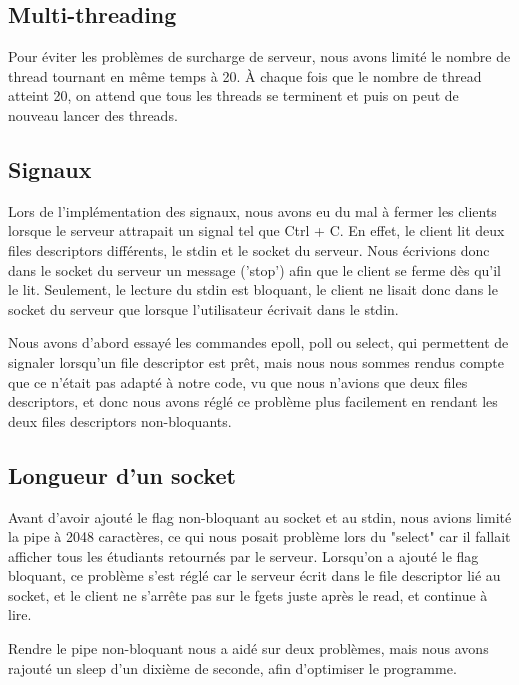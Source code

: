 \documentclass[utf8]{article}
\begin{document}
\begin{large}
\par
\subsection{Multi-threading}

\par 
\indent

Pour éviter les problèmes de surcharge de serveur, nous avons limité le nombre
de thread tournant en même temps à 20.
À chaque fois que le nombre de thread atteint 20, on attend que tous les threads se terminent 
et puis on peut de nouveau lancer des threads.
\par
\subsection{Signaux}
\par
\indent

Lors de l'implémentation des signaux, nous avons eu du mal à fermer les clients
lorsque le serveur attrapait un signal tel que Ctrl + C. En effet, le client lit
deux files descriptors différents, le stdin et le socket du serveur. Nous
écrivions donc dans le socket du serveur un message ('stop') afin que le client
se ferme dès qu'il le lit. Seulement, le lecture du stdin est bloquant, le
client ne lisait donc dans le socket du serveur que lorsque l'utilisateur
écrivait dans le stdin. 
\par
\par
Nous avons d'abord essayé les commandes epoll, poll ou select, qui permettent de
signaler lorsqu'un file descriptor est prêt, mais nous nous sommes rendus compte
que ce n'était pas adapté à notre code, vu que nous n'avions que deux files
descriptors, et donc nous avons réglé ce problème plus facilement en rendant les
deux files descriptors non-bloquants.
\par
\subsection{Longueur d'un socket}
\par
\indent

Avant d'avoir ajouté le flag non-bloquant au socket et au stdin, nous avions
limité la pipe à 2048 caractères, ce qui nous posait problème lors du "select"
car il fallait afficher tous les étudiants retournés par le serveur. Lorsqu'on a
ajouté le flag bloquant, ce problème s'est réglé car le serveur écrit dans le
file descriptor lié au socket, et le client ne s'arrête pas sur le fgets juste
après le read, et continue à lire.
\par
Rendre le pipe non-bloquant nous a aidé sur deux problèmes, mais nous avons
rajouté un sleep d'un dixième de seconde, afin d'optimiser le programme.
\par


\end{large}
\end{document}
